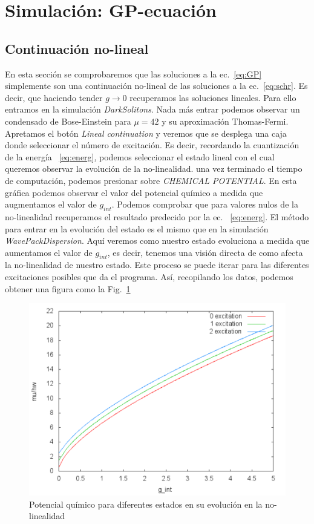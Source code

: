 
\section{Simulaci\'on: GP-ecuaci\'on}
\subsection{Continuaci\'on no-lineal}
En esta secci\'on se comprobaremos que las soluciones a la ec.~\eqref{eq:GP} simplemente son una continuaci\'on no-lineal de las soluciones a la ec.~\eqref{eq:schr}. Es decir, que haciendo tender $g\rightarrow0$ recuperamos las soluciones lineales. Para ello entramos en la simulaci\'on \textit{DarkSolitons}. Nada m\'as entrar podemos observar un condensado de Bose-Einstein para $\mu=42$ y su aproximaci\'on Thomas-Fermi. Apretamos el bot\'on \textit{Lineal continuation} y veremos que se desplega una caja donde seleccionar el n\'umero de excitaci\'on. Es decir, recordando la cuantizaci\'on de la energ\'ia ~\eqref{eq:energ}, podemos seleccionar el estado lineal con el cual queremos observar la evoluci\'on de la no-linealidad. una vez terminado el tiempo de computaci\'on, podemos presionar sobre \textit{CHEMICAL POTENTIAL}. En esta gr\'afica podemos observar el valor del potencial qu\'imico a medida que augmentamos el valor de $g_{int}$. Podemos comprobar que para valores nulos de la no-linealidad recuperamos el resultado predecido por la ec.  ~\eqref{eq:energ}. El m\'etodo para entrar en la evoluci\'on del estado es el mismo que en la simulaci\'on \textit{WavePackDispersion}. Aqu\'i veremos como nuestro estado evoluciona a medida que aumentamos el valor de $g_{int}$, es decir, tenemos una visi\'on directa de como afecta la no-linealidad de nuestro estado. Este proceso se puede iterar para las diferentes excitaciones posibles que da el programa. As\'i, recopilando los datos, podemos obtener una figura como la Fig.~\ref{Fig:cont_lin}


\begin{figure}[tb]
	\centering
	\includegraphics[width=0.9\linewidth]{cont_lin.pdf}
	\caption{Potencial qu\'imico para diferentes estados en su evoluci\'on en la no-linealidad}
	\label{Fig:cont_lin}
\end{figure}

